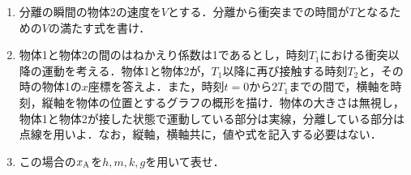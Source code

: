 \begin{enumerate}[label={\textbf{問\arabic*}}]
\begin{enumerate}[(1)]
    \item {\hzw}分離の瞬間の物体2の速度を$V$とする．分離から衝突までの時間が$T$となるための$V$の満たす式を書け．
    \item {\hzw}物体1と物体2の間のはねかえり係数は1であるとし，時刻$T_1$における衝突以降の運動を考える．物体1と物体2が，$T_1$以降に再び接触する時刻$T_2$と，その時の物体1の$x$座標を答えよ．また，時刻$t=0$から$2T_1$までの間で，横軸を時刻，縦軸を物体の位置とするグラフの概形を描け．物体の大きさは無視し，物体1と物体2が接した状態で運動している部分は実線，分離している部分は点線を用いよ．なお，縦軸，横軸共に，値や式を記入する必要はない．
    \item {\hzw}この場合の$x_\mathrm{A}$を$h, m, k, g$を用いて表せ．
  \end{enumerate}
\end{enumerate}

